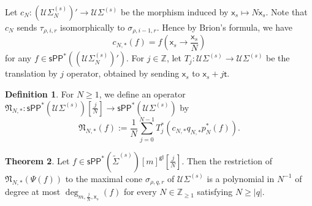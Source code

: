 \documentclass[11pt]{article}
\newcommand{\sPP}{\mathsf{sPP}}
\newcommand{\spp}{\sPP}
\theoremstyle{definition}
\newtheorem{definition}{Definition}[section]
\newtheorem{theorem}[definition]{Theorem}
\begin{document}
Let $c_N:(\mathcal U\Sigma_N^{(s)})'\to \mathcal U\Sigma^{(s)}$ be the morphism
induced by $\mathsf{x}_s\mapsto N\mathsf{x}_s$. Note that $c_N$ sends $\tau_{\rho,i,r}$
isomorphically to $\sigma_{\rho,i-1,r}$. Hence by Brion's formula,
we have
$$c_{N,\ast}(f)=f\left(\mathsf{x}_s\to \frac{\mathsf{x}_s}{N}\right)$$
for any $f\in \spp^{\ast}((\mathcal U\Sigma_N^{(s)})')$. For $j\in \mathbb{Z}$,
let $T_j:\mathcal U\Sigma^{(s)}\to \mathcal U\Sigma^{(s)}$ be the translation by $j$
operator, obtained by sending $\mathsf{x}_s$ to $\mathsf{x}_s+j\mathsf{t}$.

\begin{definition}
	For $N\ge 1$, we define an operator
	$\mathfrak{N}_{N,\ast}:\spp^{\ast}(\mathcal U\Sigma^{(s)})\left[\frac{j}{N}\right]\to \spp^{\ast}(\mathcal U\Sigma^{(s)})$ by
	$$\mathfrak{N}_{N,\ast}(f):=\frac{1}{N}\sum_{j=0}^{N-1}T_j ^{\ast}(c_{N,\ast}q_{N,\ast}p_N^{\ast}(f)).$$
\end{definition}

\begin{theorem}\label{thm:polynomiality_lower}
	Let $f\in \spp^{\ast}(\tilde{\Sigma}^{(s)})[m]^{\mathsf{gl}}\left[\frac{j}{N}\right]$. Then
	the restriction of $\mathfrak{N}_{N,\ast}(\Psi(f))$ to the maximal
	cone $\sigma_{\rho,q,r}$ of $\mathcal U\Sigma^{(s)}$ is a polynomial in $N^{-1}$ of degree at most
	$\deg_{m,\frac{j}{N},\mathsf{x}_s}(f)$ for every $N\in \mathbb{Z}_{\ge 1}$ satisfying $N\ge |q|$.
\end{theorem}
\end{document}
